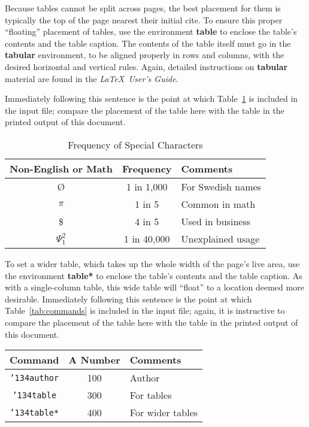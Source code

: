\documentclass[acmtog]{acmart}
\begin{document}
	Because tables cannot be split across pages, the best placement for
	them is typically the top of the page nearest their initial cite.  To
	ensure this proper ``floating'' placement of tables, use the
	environment \textbf{table} to enclose the table's contents and the
	table caption.  The contents of the table itself must go in the
	\textbf{tabular} environment, to be aligned properly in rows and
	columns, with the desired horizontal and vertical rules.  Again,
	detailed instructions on \textbf{tabular} material are found in the
	\textit{\LaTeX\ User's Guide}.
	
	Immediately following this sentence is the point at which
	Table~\ref{tab:freq} is included in the input file; compare the
	placement of the table here with the table in the printed output of
	this document.
	
	\begin{table}
		\caption{Frequency of Special Characters}
		\label{tab:freq}
		\begin{tabular}{ccl}
			\toprule
			Non-English or Math&Frequency&Comments\\
			\midrule
			\O & 1 in 1,000& For Swedish names\\
			$\pi$ & 1 in 5& Common in math\\
			\$ & 4 in 5 & Used in business\\
			$\Psi^2_1$ & 1 in 40,000& Unexplained usage\\
			\bottomrule
		\end{tabular}
	\end{table}
	
	To set a wider table, which takes up the whole width of the page's
	live area, use the environment \textbf{table*} to enclose the table's
	contents and the table caption.  As with a single-column table, this
	wide table will ``float'' to a location deemed more
	desirable. Immediately following this sentence is the point at which
	Table~\ref{tab:commands} is included in the input file; again, it is
	instructive to compare the placement of the table here with the table
	in the printed output of this document.
	
	\begin{table*}
		\caption{Some Typical Commands}
		\label{tab:commands}
		\begin{tabular}{ccl}
			\toprule
			Command &A Number & Comments\\
			\midrule
			\texttt{{\char'134}author} & 100& Author \\
			\texttt{{\char'134}table}& 300 & For tables\\
			\texttt{{\char'134}table*}& 400& For wider tables\\
			\bottomrule
		\end{tabular}
	\end{table*}
	
\end{document}
